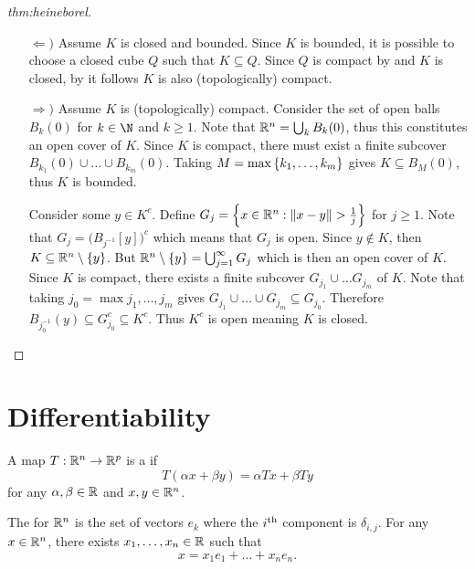 \documentclass[../main.tex]{subfiles}
\begin{document}
\begin{proof}[thm:heineborel]
    \begin{enumerate}
        \item[$\Leftarrow)$]
            Assume $K$ is closed and bounded. Since $K$ is bounded, it is possible to choose a closed cube $Q$ such that $K \subseteq Q$. Since $Q$ is compact by  and $K$ is closed, by  it follows $K$ is also (topologically) compact.
        \item[$\Rightarrow)$]
            Assume $K$ is (topologically) compact. Consider the set of open balls $B_k(0)$ for $k \in \N$ and $k \geq 1$. Note that $\mathbb{R}^n = \bigcup_{k} B_k(0)$, thus this constitutes an open cover of $K$. Since $K$ is compact, there must exist a finite subcover $B_{k_1}(0) \cup \ldots \cup B_{k_m}(0)$. Taking $M = \max\qty{k_1, \ldots, k_m}$ gives $K \subseteq B_{M}(0)$, thus $K$ is bounded.

            Consider some $y \in K^c$. Define $G_j = \qty{x \in \mathbb{R}^n : \norm{x - y} > \frac{1}{j}}$ for $j \geq 1$. Note that $G_j = \bigl(B_{j^{-1}}[y]\bigr)^c$ which means that $G_j$ is open. Since $y \notin K$, then $K \subseteq \mathbb{R}^n \setminus \qty{y}$. But $\mathbb{R}^n \setminus \qty{y} = \bigcup_{j=1}^\infty G_j$ which is then an open cover of $K$. Since $K$ is compact, there exists a finite subcover $G_{j_1} \cup \ldots G_{j_m}$ of $K$. Note that taking $j_0 = \max{j_1, \ldots, j_m}$ gives $G_{j_1} \cup \ldots \cup G_{j_m} \subseteq G_{j_0}$. Therefore $B_{j_0^{-1}}(y) \subseteq G_{j_0}^c \subseteq K^c$. Thus $K^c$ is open meaning $K$ is closed.
    \end{enumerate}
\end{proof}

\chapter{Differentiability}

\begin{definition}
    A map $T : \mathbb{R}^n \to \mathbb{R}^p$ is a  if
    \[
        T(\alpha x + \beta y) = \alpha Tx + \beta Ty
    \]
    for any $\alpha, \beta \in \mathbb{R}$ and $x, y \in \mathbb{R}^n$.
\end{definition}

\begin{definition}
    The  for $\mathbb{R}^n$ is the set of vectors $e_k$ where the $i^{\text{th}}$ component is $\delta_{i,j}$. For any $x \in \mathbb{R}^n$, there exists $x_1, \ldots, x_n \in \mathbb{R}$ such that
    \[
        x = x_1 e_1 + \ldots + x_n e_n
    .\]
\end{definition}
\end{document}
